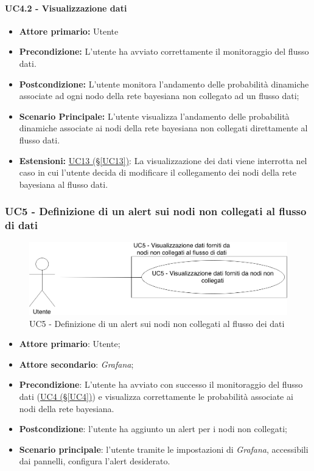 \paragraph{UC4.2 - Visualizzazione dati}\label{UC4.2}
\begin{itemize}
\item \textbf{Attore primario:} Utente
\item \textbf{Precondizione:} L'utente ha avviato correttamente il monitoraggio del flusso dati.
\item \textbf{Postcondizione:} L'utente monitora l'andamento delle probabilità dinamiche associate ad ogni nodo della rete bayesiana non collegato ad un flusso dati;
\item \textbf{Scenario Principale:} L'utente visualizza l'andamento delle probabilità dinamiche associate ai nodi 			della rete bayesiana non collegati direttamente al flusso dati.
\item \textbf{Estensioni:} \hyperref[UC13]{UC13 (§\ref*{UC13})}: La visualizzazione dei dati viene interrotta nel 			caso in cui l'utente decida di modificare il collegamento dei nodi della rete bayesiana al flusso dati.
\end{itemize}

\newpage

\subsubsection{UC5 - Definizione di un alert sui nodi non collegati al flusso di dati}\label{UC5}

\begin{figure}[H]
	\centering
	\includegraphics[scale=0.4]{./images/UC5.png}
	\caption{UC5 - Definizione di un alert sui nodi non collegati al flusso dei dati}
\end{figure}

\begin{itemize}
	\item \textbf{Attore primario}: Utente;
	\item \textbf{Attore secondario}: \textit{Grafana};
	\item \textbf{Precondizione}: L'utente ha avviato con successo il monitoraggio del flusso dati (\hyperref[UC4]					{UC4 (§\ref*{UC4})}) e visualizza correttamente le probabilità associate ai nodi della rete bayesiana.
	\item \textbf{Postcondizione}: l'utente ha aggiunto un alert per i nodi non collegati;
	\item \textbf{Scenario principale}: l'utente tramite le impostazioni di \textit{Grafana}, accessibili dai pannelli, configura l'alert desiderato.
\end{itemize}

